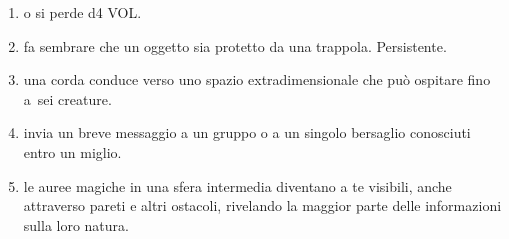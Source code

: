 \documentclass[itdr]{subfiles}
\begin{document}
\begin{enumerate}
	\item {}  o si perde d4 VOL.
	\item {} fa sembrare che un oggetto sia protetto da una trappola. Persistente.
	\item {} una corda conduce verso uno spazio extradimensionale che può ospitare fino a~sei creature.
	\item {} invia un breve messaggio a un gruppo o a un singolo bersaglio conosciuti entro un miglio.
	\item {} le auree magiche in una sfera intermedia diventano a te visibili, anche attraverso pareti e altri ostacoli, rivelando la maggior parte delle informazioni sulla loro natura.
\end{enumerate}

\vfill
\break
\end{document}

